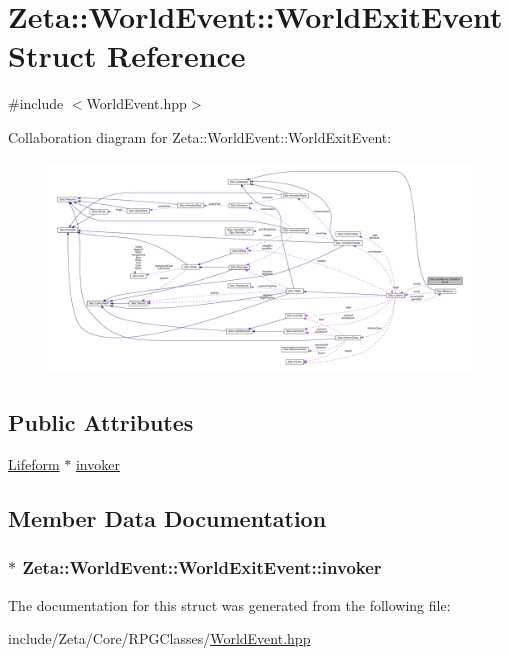 \hypertarget{structZeta_1_1WorldEvent_1_1WorldExitEvent}{\section{Zeta\+:\+:World\+Event\+:\+:World\+Exit\+Event Struct Reference}
\label{structZeta_1_1WorldEvent_1_1WorldExitEvent}
}


{\ttfamily \#include $<$World\+Event.\+hpp$>$}



Collaboration diagram for Zeta\+:\+:World\+Event\+:\+:World\+Exit\+Event\+:
\nopagebreak
\begin{figure}[H]
\begin{center}
\leavevmode
\includegraphics[width=350pt]{structZeta_1_1WorldEvent_1_1WorldExitEvent__coll__graph}
\end{center}
\end{figure}
\subsection*{Public Attributes}
\begin{DoxyCompactItemize}
\item 
\hyperlink{classZeta_1_1Lifeform}{Lifeform} $\ast$ \hyperlink{structZeta_1_1WorldEvent_1_1WorldExitEvent_a0a4e9cccec20d0bdab7c474d316fc86e}{invoker}
\end{DoxyCompactItemize}


\subsection{Member Data Documentation}
\hypertarget{structZeta_1_1WorldEvent_1_1WorldExitEvent_a0a4e9cccec20d0bdab7c474d316fc86e}{
\subsubsection[{invoker}]{$\ast$ Zeta\+::\+World\+Event\+::\+World\+Exit\+Event\+::invoker}}\label{structZeta_1_1WorldEvent_1_1WorldExitEvent_a0a4e9cccec20d0bdab7c474d316fc86e}


The documentation for this struct was generated from the following file\+:\begin{DoxyCompactItemize}
\item 
include/\+Zeta/\+Core/\+R\+P\+G\+Classes/\hyperlink{WorldEvent_8hpp}{World\+Event.\+hpp}\end{DoxyCompactItemize}
